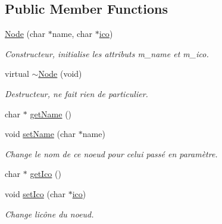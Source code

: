 \subsection*{Public Member Functions}
\begin{DoxyCompactItemize}
\item 
\hyperlink{class_e_p_1_1_node_a9df197a78c36646fba1670935f5ea948}{Node} (char $\ast$name, char $\ast$\hyperlink{namespace_e_p_a9bb18717237cbb94269e26c77cc04b05}{ico})
\begin{DoxyCompactList}\small\item\em Constructeur, initialise les attributs m\+\_\+name et m\+\_\+ico. \end{DoxyCompactList}\item 
virtual \hyperlink{class_e_p_1_1_node_a247e246a75f5b7111d53a1e4de19fb0b}{$\sim$\+Node} (void)
\begin{DoxyCompactList}\small\item\em Destructeur, ne fait rien de particulier. \end{DoxyCompactList}\item 
char $\ast$ \hyperlink{class_e_p_1_1_node_ad5dd5dfbe1e26a22de54035a16ddb980}{get\+Name} ()
\item 
void \hyperlink{class_e_p_1_1_node_a27a879726020308b8fd47812ec4a8b86}{set\+Name} (char $\ast$name)
\begin{DoxyCompactList}\small\item\em Change le nom de ce noeud pour celui passé en paramètre. \end{DoxyCompactList}\item 
char $\ast$ \hyperlink{class_e_p_1_1_node_a7e29d725cfe687589f5668c9825fc303}{get\+Ico} ()
\item 
void \hyperlink{class_e_p_1_1_node_a0f1a35a7f9e6d18d38a17b591a130862}{set\+Ico} (char $\ast$\hyperlink{namespace_e_p_a9bb18717237cbb94269e26c77cc04b05}{ico})
\begin{DoxyCompactList}\small\item\em Change l\textquotesingle{}icône du noeud. \end{DoxyCompactList}\end{DoxyCompactItemize}
